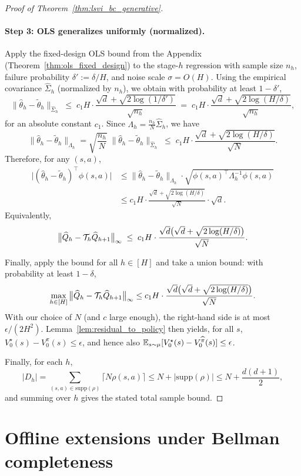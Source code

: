 \begin{proof}[Proof of Theorem~\ref{thm:lsvi_bc_generative}]
\paragraph{Step 3: OLS generalizes uniformly (normalized).}
Apply the fixed-design OLS bound from the Appendix (Theorem~\ref{thm:ols_fixed_design})
to the stage-$h$ regression with sample size $n_h$, failure probability
$\delta' := \delta/H$, and noise scale $\sigma=O(H)$. Using the empirical covariance
$\widehat\Sigma_h$ (normalized by $n_h$), we obtain with probability at least $1-\delta'$,
\[
\|\widehat\theta_h-\tilde\theta_h\|_{\widehat\Sigma_h}
\;\le\;
c_1 H \cdot \frac{\sqrt{d}+\sqrt{2\log(1/\delta')}}{\sqrt{n_h}}
\;=\;
c_1 H \cdot \frac{\sqrt{d}+\sqrt{2\log(H/\delta)}}{\sqrt{n_h}},
\]
for an absolute constant $c_1$.
Since $\Lambda_h = \frac{n_h}{N}\widehat\Sigma_h$, we have
\[
\|\widehat\theta_h-\tilde\theta_h\|_{\Lambda_h}
=
\sqrt{\frac{n_h}{N}}\;\|\widehat\theta_h-\tilde\theta_h\|_{\widehat\Sigma_h}
\;\le\;
c_1 H \cdot \frac{\sqrt{d}+\sqrt{2\log(H/\delta)}}{\sqrt{N}}.
\]
Therefore, for any $(s,a)$,
\begin{align*}
\big|(\widehat\theta_h-\tilde\theta_h)^\top \phi(s,a)\big|
&\le
\|\widehat\theta_h-\tilde\theta_h\|_{\Lambda_h}\cdot
\sqrt{\phi(s,a)^\top \Lambda_h^{-1}\phi(s,a)} \\
&\le
c_1 H \cdot \frac{\sqrt{d}+\sqrt{2\log(H/\delta)}}{\sqrt{N}}
\cdot \sqrt{d}.
\end{align*}
Equivalently,
\[
\big\|\widehat Q_h - \mathcal{T}_h \widehat Q_{h+1}\big\|_\infty
\;\le\;
c_1 H \cdot \frac{\sqrt{d}\big(\sqrt{d}+\sqrt{2\log(H/\delta)}\big)}{\sqrt{N}}.
\]

Finally, apply the bound for all $h\in[H]$ and take a union bound: with probability at least
$1-\delta$,
\[
\max_{h\in[H]}\big\|\widehat Q_h - \mathcal{T}_h \widehat Q_{h+1}\big\|_\infty
\le
c_1 H \cdot \frac{\sqrt{d}\big(\sqrt{d}+\sqrt{2\log(H/\delta)}\big)}{\sqrt{N}}.
\]
With our choice of $N$ (and $c$ large enough), the right-hand side is at most
$\epsilon/(2H^2)$. Lemma~\ref{lem:residual_to_policy} then yields, for all $s$,
$V_0^\star(s) - V_0^{\widehat\pi}(s)\le \epsilon$, and hence also
$\mathbb{E}_{s\sim\mu}[V_0^\star(s)-V_0^{\widehat\pi}(s)]\le\epsilon$.

Finally, for each $h$,
\[
|D_h|
=
\sum_{(s,a)\in\mathrm{supp}(\rho)} \lceil N\rho(s,a)\rceil
\le
N + |\mathrm{supp}(\rho)|
\le
N + \frac{d(d+1)}{2},
\]
and summing over $h$ gives the stated total sample bound.
\end{proof}


\section{Offline extensions under Bellman completeness}
\label{sec:BC_offline}

